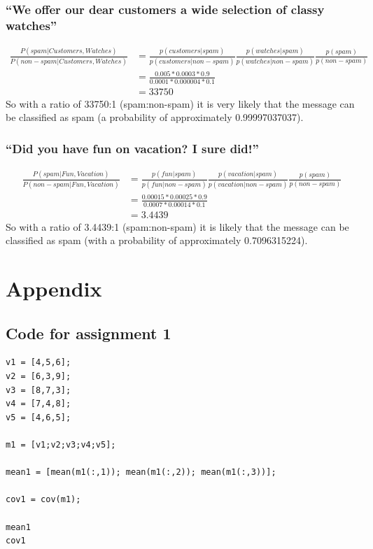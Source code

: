 \documentclass[10pt]{article}
\begin{document}
\subsubsection{``We offer our dear customers a wide selection of classy watches''}
\begin{align}
\frac{P(spam|Customers,Watches)}{P(non-spam|Customers,Watches)}
 & = \frac{p(customers|spam)}{p(customers|non-spam)} \frac{p(watches|spam)}{p(watches|non-spam)} \frac{p(spam)}{p(non-spam)} \\
 & = \frac{0.005*0.0003*0.9}{0.0001*0.000004*0.1} \\
 & = 33750
\end{align}
So with a ratio of 33750:1 (spam:non-spam) it is very likely that the message can be classified as spam (a probability of approximately 0.99997037037).

\subsubsection{``Did you have fun on vacation? I sure did!''}
\begin{align}
\frac{P(spam|Fun,Vacation)}{P(non-spam|Fun,Vacation)}
& = \frac{p(fun|spam)}{p(fun|non-spam)} \frac{p(vacation|spam)}{p(vacation|non-spam)} \frac{p(spam)}{p(non-spam)} \\
& = \frac{0.00015*0.00025*0.9}{0.0007*0.00014*0.1} \\
& = 3.4439
\end{align}
So with a ratio of 3.4439:1 (spam:non-spam) it is likely that the message can be classified as spam (with a probability of approximately 0.7096315224).

\section*{Appendix}
\subsection*{Code for assignment 1}
\begin{lstlisting}
v1 = [4,5,6];
v2 = [6,3,9];
v3 = [8,7,3];
v4 = [7,4,8];
v5 = [4,6,5];

m1 = [v1;v2;v3;v4;v5];

mean1 = [mean(m1(:,1)); mean(m1(:,2)); mean(m1(:,3))];

cov1 = cov(m1);

mean1
cov1
\end{lstlisting}
\end{document}
